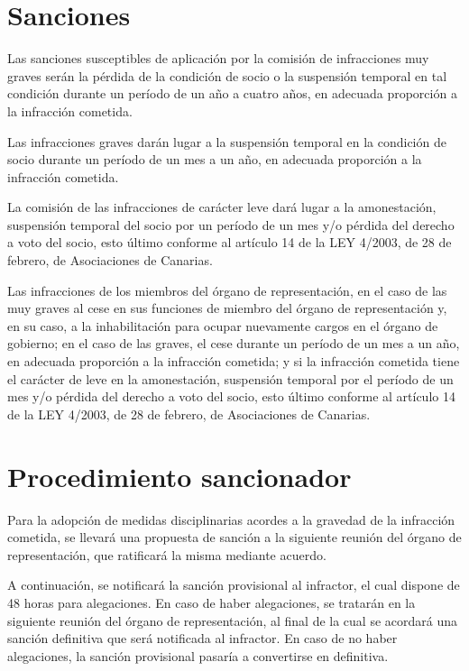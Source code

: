 \documentclass[a4paper, 12pt, oneside]{book}
\begin{document}
\section{Sanciones}

Las sanciones susceptibles de aplicación por la comisión de infracciones muy graves serán la pérdida de la condición de socio o la suspensión temporal en tal condición durante un período de un año a cuatro años, en adecuada proporción a la infracción cometida.

Las infracciones graves darán lugar a la suspensión temporal en la condición de socio durante un período de un mes a un año, en adecuada proporción a la infracción cometida.

La comisión de las infracciones de carácter leve dará lugar a la amonestación, suspensión temporal del socio por un período de un mes y/o pérdida del derecho a voto del socio, esto último conforme al artículo 14 de la LEY 4/2003, de 28 de febrero, de Asociaciones de Canarias.

Las infracciones de los miembros del órgano de representación, en el caso de las muy graves al cese en sus funciones de miembro del órgano de representación y, en su caso, a la inhabilitación para ocupar nuevamente cargos en el órgano de gobierno; en el caso de las graves, el cese durante un período de un mes a un año, en adecuada proporción a la infracción cometida; y si la infracción cometida tiene el carácter de leve en la amonestación, suspensión temporal por el período de un mes y/o pérdida del derecho a voto del socio, esto último conforme al artículo 14 de la LEY 4/2003, de 28 de febrero, de Asociaciones de Canarias.

\section{Procedimiento sancionador}

Para la adopción de medidas disciplinarias acordes a la gravedad de la infracción cometida, se llevará una propuesta de sanción a la siguiente reunión del órgano de representación, que ratificará la misma mediante acuerdo.

A continuación, se notificará la sanción provisional al infractor, el cual dispone de 48 horas para alegaciones. En caso de haber alegaciones, se tratarán en la siguiente reunión del órgano de representación, al final de la cual se acordará una sanción definitiva que será notificada al infractor. En caso de no haber alegaciones, la sanción provisional pasaría a convertirse en definitiva.
\end{document}
